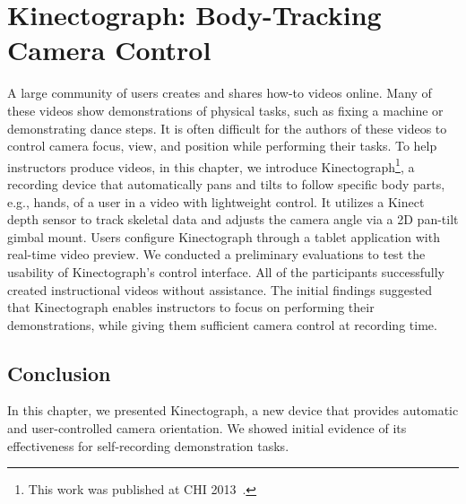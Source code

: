 \chapter{Kinectograph: Body-Tracking Camera Control}
\label{chapter_kinectograph}

A large community of users creates and shares how-to videos online. Many of these videos show demonstrations of physical tasks, such as fixing a machine or demonstrating dance steps. It is often difficult for the authors of these videos to control camera focus, view, and position while performing their tasks.
%
To help instructors produce videos, in this chapter, we introduce Kinectograph\footnote{This work was published at CHI 2013~\cite{Cheng:2013:BCC:2468356.2468568}.}, a recording device that automatically pans and tilts to follow specific body parts, e.g., hands, of a user in a video with lightweight control. It utilizes a Kinect depth sensor to track skeletal data and adjusts the camera angle via a 2D pan-tilt gimbal mount. Users configure Kinectograph through a tablet application with real-time video preview. We conducted a preliminary evaluations to test the usability of Kinectograph's control interface. All of the participants successfully created instructional videos without assistance. The initial findings suggested that Kinectograph enables instructors to focus on performing their demonstrations, while giving them sufficient camera control at recording time.











\section{Conclusion}
In this chapter, we presented Kinectograph, a new device that provides automatic and user-controlled camera orientation. We showed initial evidence of its effectiveness for self-recording demonstration tasks.
